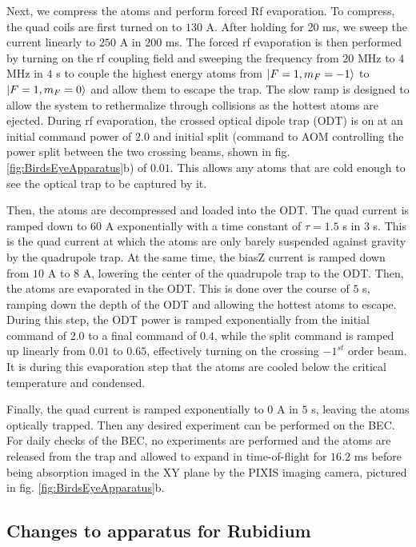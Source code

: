 Next, we compress the atoms and perform forced Rf evaporation. To compress, the quad coils are first turned on to $130$ A. After holding for 20 ms, we sweep the current linearly to $250$ A in $200$ ms. The forced rf evaporation is then performed by turning on the rf coupling field and sweeping the frequency from $20$ MHz to $4$ MHz in $4$ s to couple the highest energy atoms from $\mathinner{|{F=1,m_F=-1}\rangle}$ to $\mathinner{|{F=1,m_F=0}\rangle}$ and allow them to escape the trap. The slow ramp is designed to allow the system to rethermalize through collisions as the hottest atoms are ejected.  During rf evaporation, the crossed optical dipole trap (ODT) is on at an initial command power of $2.0$ and initial split (command to AOM controlling the power split between the two crossing beams, shown in fig. \ref{fig:BirdsEyeApparatus}b) of $0.01$. This allows any atoms that are cold enough to see the optical trap  to be captured by it.

Then, the atoms are decompressed and loaded into the ODT. The quad current is ramped down to $60$ A exponentially with a time constant of $\tau=1.5$ s in $3$ s. This is the quad current at which the atoms are only barely suspended against gravity by the quadrupole trap. At the same time, the biasZ current is ramped down from $10$ A to $8$ A, lowering the center of the quadrupole trap to the ODT. Then, the atoms are evaporated in the ODT. This is done over the course of $5$ s, ramping down the depth of the ODT and allowing the hottest atoms to escape. During this step, the ODT power is ramped exponentially from the initial command of $2.0$ to a final command of $0.4$, while the split command is ramped up linearly from $0.01$ to $0.65$, effectively turning on the crossing $-1^{st}$ order beam. It is during this evaporation step that the atoms are cooled below the critical temperature and condensed.

Finally, the quad current is ramped exponentially to $0$ A in $5$ s, leaving the atoms optically trapped. Then any desired experiment can be performed on the BEC. For daily checks of the BEC, no experiments are performed and the atoms are released from the trap and allowed to expand in time-of-flight for $16.2$ ms before being absorption imaged in the XY plane by the PIXIS imaging camera, pictured in fig. \ref{fig:BirdsEyeApparatus}b.

\subsection{Changes to apparatus for Rubidium}\label{sec:BECchanges}

